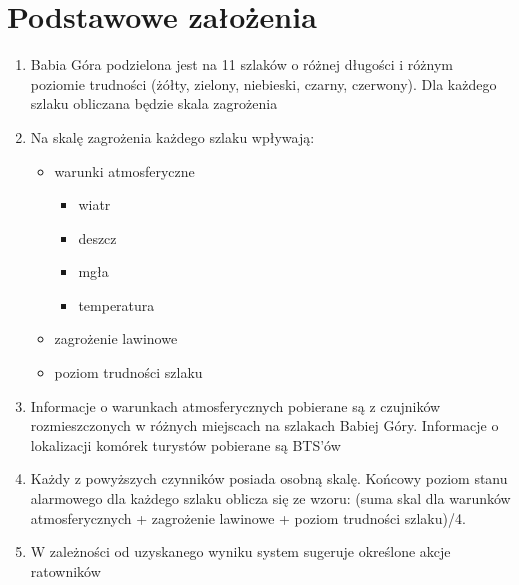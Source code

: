 \documentclass[a4paper,12pt]{article}
\begin{document}
\section{Podstawowe założenia}
\begin{enumerate}
\item Babia Góra podzielona jest na 11 szlaków o różnej długości i różnym poziomie trudności (żółty, zielony, niebieski, czarny, czerwony). Dla każdego szlaku obliczana będzie skala zagrożenia
\item Na skalę zagrożenia każdego szlaku wpływają:
\begin{itemize}
\item warunki atmosferyczne
\begin{itemize}
\item wiatr
\item deszcz
\item mgła
\item temperatura
\end{itemize}
\item zagrożenie lawinowe
\item poziom trudności szlaku
\end{itemize}
\item Informacje o warunkach atmosferycznych pobierane są z czujników rozmieszczonych w różnych miejscach na szlakach Babiej Góry. Informacje o lokalizacji komórek turystów pobierane są BTS’ów
\item Każdy z powyższych czynników posiada osobną skalę. Końcowy poziom stanu alarmowego dla każdego szlaku oblicza się ze wzoru: (suma skal dla warunków atmosferycznych + zagrożenie lawinowe + poziom trudności szlaku)/4.
\item W zależności od uzyskanego wyniku system sugeruje określone akcje ratowników
\end{enumerate}
\newpage
\end{document}
